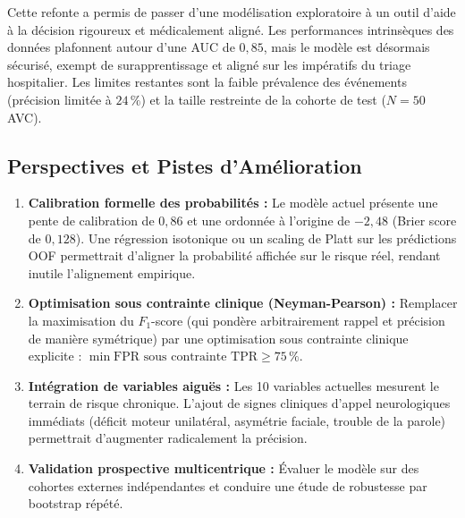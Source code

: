 Cette refonte a permis de passer d'une modélisation exploratoire à un outil d'aide à la décision rigoureux et médicalement aligné. Les performances intrinsèques des données plafonnent autour d'une AUC de $0{,}85$, mais le modèle est désormais sécurisé, exempt de surapprentissage et aligné sur les impératifs du triage hospitalier. Les limites restantes sont la faible prévalence des événements (précision limitée à $24\,\%$) et la taille restreinte de la cohorte de test ($N=50$ AVC).

\subsection{Perspectives et Pistes d'Amélioration}

\begin{enumerate}
    \item \textbf{Calibration formelle des probabilités :} Le modèle actuel présente une pente de calibration de $0{,}86$ et une ordonnée à l'origine de $-2{,}48$ (Brier score de $0{,}128$). Une régression isotonique ou un scaling de Platt sur les prédictions OOF permettrait d'aligner la probabilité affichée sur le risque réel, rendant inutile l'alignement empirique.
    \item \textbf{Optimisation sous contrainte clinique (Neyman-Pearson) :} Remplacer la maximisation du $F_1$-score (qui pondère arbitrairement rappel et précision de manière symétrique) par une optimisation sous contrainte clinique explicite : $\min \text{FPR} \text{ sous contrainte } \text{TPR} \ge 75\,\%$.
    \item \textbf{Intégration de variables aiguës :} Les 10 variables actuelles mesurent le terrain de risque chronique. L'ajout de signes cliniques d'appel neurologiques immédiats (déficit moteur unilatéral, asymétrie faciale, trouble de la parole) permettrait d'augmenter radicalement la précision.
    \item \textbf{Validation prospective multicentrique :} Évaluer le modèle sur des cohortes externes indépendantes et conduire une étude de robustesse par bootstrap répété.
\end{enumerate}
